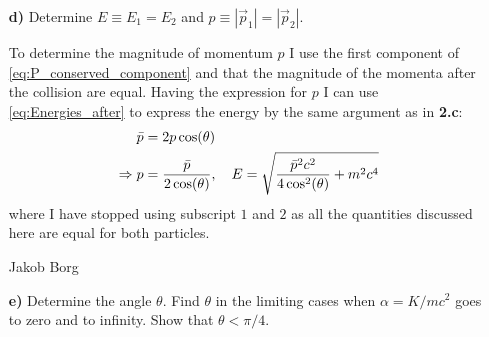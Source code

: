 \documentclass[11pt,a4paper]{report}
\newcounter{excount}[chapter]
\newenvironment{exercise}[1][]{\addtocounter{excount}{1} \noindent {\bf Problem
    \arabic{excount} \ \ #1}\hspace{2mm}}{\vspace{4mm}}
\newenvironment{solution}[1][]
    {\begin{tcolorbox}[title=Solution #1,halign lower=right,breakable]
    }
    {
    \tcblower Jakob Borg
    \end{tcolorbox}
	\vspace{5mm}
    }
\newcommand{\cost}
{
\cos(\theta)
}
\newcommand{\coscost}
{
\cos[2](\theta)
}
\begin{document}
\begin{exercise}
\begin{itemize}
\begin{solution}[\bf 2.c]
This problem can also be solved (maybe in a nicer way) by looking at the system from the center-of-mass RF (CoM).
\end{solution}

\item[\bf d)] Determine $E\equiv E_1=E_2$ and $p\equiv |\vec p_1|=|\vec p_2|$.
\begin{solution}[\bf 2.d]
To determine the magnitude of momentum $p$ I use the first component of \cref{eq:P_conserved_component} and that the magnitude of the momenta after the collision are equal. Having the expression for $p$ I can use \cref{eq:Energies_after} to express the energy by the same argument as in \textbf{2.c}:
\begin{align*}
\bar{p} &= 2p\cost
\\
\Rightarrow p &= \frac{\bar{p}}{2\cost} \qc E = \sqrt{\frac{\bar{p}^2c^2}{4\coscost} + m^2c^4}
\end{align*}
where I have stopped using subscript $1$ and $2$ as all the quantities discussed here are equal for both particles.
\end{solution}

\item[\bf e)] Determine the angle $\theta$. Find $\theta$ in the limiting cases when $\alpha=K/mc^2$ goes to zero and to infinity. Show that $\theta<\pi/4$. 
\end{itemize}


\end{exercise}
\end{document}
